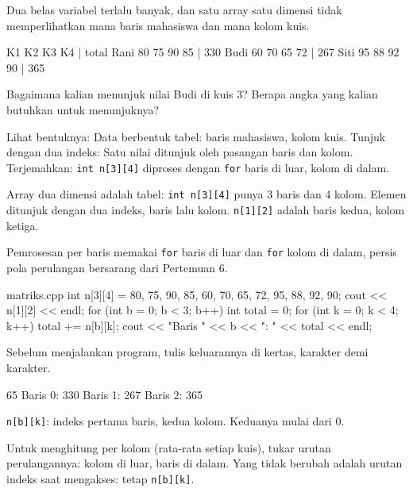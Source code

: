 \documentclass[a4paper]{article}
\begin{document}
Dua belas variabel terlalu banyak, dan satu array satu dimensi tidak memperlihatkan mana baris mahasiswa dan mana kolom kuis.

\begin{MKeluaran}[title={Tampilan yang diinginkan}]
       K1 K2 K3 K4 | total
Rani   80 75 90 85 | 330
Budi   60 70 65 72 | 267
Siti   95 88 92 90 | 365
\end{MKeluaran}
\begin{Tebak}
Bagaimana kalian menunjuk nilai Budi di kuis 3? Berapa angka yang kalian butuhkan untuk menunjuknya?
\end{Tebak}
\begin{Jawaban}
Lihat bentuknya: Data berbentuk tabel: baris mahasiswa, kolom kuis. Tunjuk dengan dua indeks: Satu nilai ditunjuk oleh pasangan baris dan kolom. Terjemahkan: \texttt{int n[3][4]} diproses dengan \texttt{for} baris di luar, kolom di dalam.
\end{Jawaban}
Array dua dimensi adalah tabel: \texttt{int n[3][4]} punya 3 baris dan 4 kolom. Elemen ditunjuk dengan dua indeks, baris lalu kolom. \texttt{n[1][2]} adalah baris kedua, kolom ketiga.

Pemrosesan per baris memakai \texttt{for} baris di luar dan \texttt{for} kolom di dalam, persis pola perulangan bersarang dari Pertemuan 6.

\begin{MKode}{matriks.cpp}
int n[3][4] = {{80, 75, 90, 85},
               {60, 70, 65, 72},
               {95, 88, 92, 90}};
cout << n[1][2] << endl;
for (int b = 0; b < 3; b++) {
    int total = 0;
    for (int k = 0; k < 4; k++) total += n[b][k];
    cout << "Baris " << b << ": " << total << endl;
}
\end{MKode}
\begin{Tebak}[]
Sebelum menjalankan program, tulis keluarannya di kertas, karakter demi karakter.
\end{Tebak}
\begin{Jawaban}[]
\begin{MKeluaran}[]
65
Baris 0: 330
Baris 1: 267
Baris 2: 365
\end{MKeluaran}
\texttt{n[b][k]}: indeks pertama baris, kedua kolom. Keduanya mulai dari 0.
\end{Jawaban}
Untuk menghitung per kolom (rata-rata setiap kuis), tukar urutan perulangannya: kolom di luar, baris di dalam. Yang tidak berubah adalah urutan indeks saat mengakses: tetap \texttt{n[b][k]}.
\end{document}
